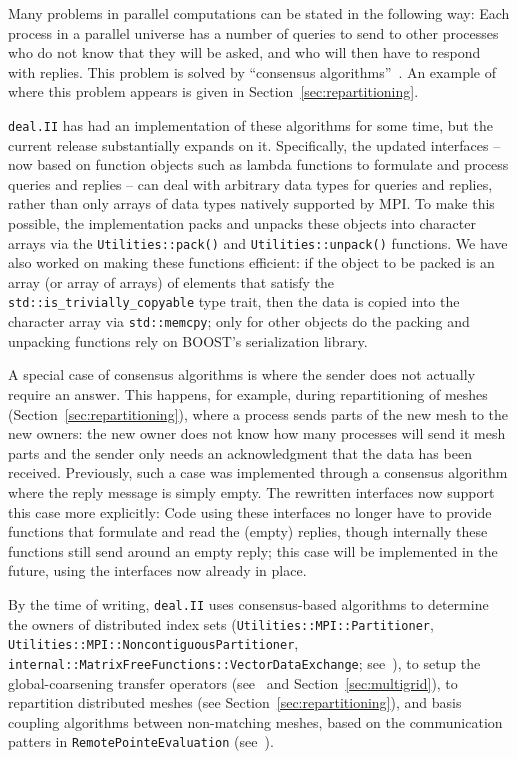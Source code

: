 \documentclass{ansarticle-preprint}
\newcommand{\specialword}[1]{\texttt{#1}}
\newcommand{\dealii}{{\specialword{deal.II}}\xspace}
\begin{document}
Many problems in parallel computations can be stated in the following
way: Each process in a parallel universe has a number of queries to
send to other processes who do not know that they will be asked, and
who will then have to respond with replies. This problem is solved by
``consensus algorithms''~\cite{hoefler2010scalable}. An example of where this problem appears is
given in Section~\ref{sec:repartitioning}.

\dealii{} has had an implementation of these algorithms for some time,
but the current release substantially expands on it. Specifically, the
updated interfaces -- now based on function objects such as lambda
functions to formulate and process queries and replies -- can deal
with arbitrary data types for queries and replies, rather than only
arrays of data types natively supported by MPI. To make this possible,
the implementation packs and unpacks these objects into character
arrays via the \texttt{Utilities::pack()} and
\texttt{Utilities::unpack()} functions. We have also worked on making
these functions efficient: if the object to be packed is an array
(or array of arrays) of elements that satisfy the
\texttt{std::is\_trivially\_copyable} type trait, then the data is
copied into the character array via \texttt{std::memcpy}; only for
other objects do the packing and unpacking functions rely on BOOST's
serialization library.

A special case of consensus algorithms is where the sender does not
actually require an answer. This happens, for example, during repartitioning
of meshes (Section~\ref{sec:repartitioning}), where a process sends parts of
the new mesh to the new owners: the new owner does not know how many processes
will send it mesh parts and the sender only needs an acknowledgment that the
data has been received. Previously, such a case was implemented through a consensus
algorithm where the reply message is simply empty.
The rewritten interfaces now support this case more explicitly: Code using
these interfaces no longer have to provide functions that formulate
and read the (empty) replies, though internally these functions still
send around an empty reply; this case will be implemented in the
future, using the interfaces now already in place.

By the time of writing, \dealii uses consensus-based algorithms to determine
the owners of distributed index sets (\texttt{Utilities::MPI::Partitioner},
\texttt{Utilities::MPI::Noncontiguous\allowbreak Partitioner}, \texttt{internal::MatrixFreeFunctions::VectorDataExchange}; see~\cite{dealII91}),
to setup the global-coarsening transfer operators (see~\cite{dealII92} and
Section~\ref{sec:multigrid}), to repartition distributed meshes (see Section~\ref{sec:repartitioning}), and basis coupling algorithms between non-matching
meshes, based on the communication patters in \texttt{RemotePointeEvaluation} (see~\cite{dealII92}).
\end{document}
